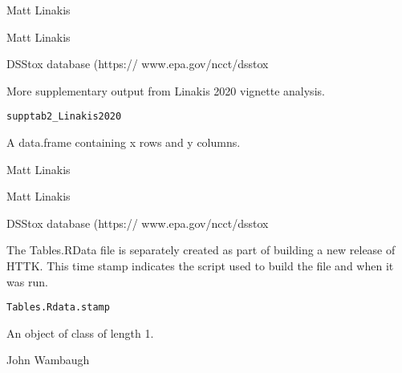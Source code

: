 \documentclass[a4paper]{book}
\begin{document}
%
\begin{Author}\relax
Matt Linakis
\end{Author}
%
\begin{Source}\relax
Matt Linakis
\end{Source}
%
\begin{References}\relax
DSStox database (https:// www.epa.gov/ncct/dsstox
\end{References}
%
\begin{Description}\relax
More supplementary output from Linakis 2020 vignette analysis.
\end{Description}
%
\begin{Usage}
\begin{verbatim}
supptab2_Linakis2020
\end{verbatim}
\end{Usage}
%
\begin{Format}
A data.frame containing x rows and y columns.
\end{Format}
%
\begin{Author}\relax
Matt Linakis
\end{Author}
%
\begin{Source}\relax
Matt Linakis
\end{Source}
%
\begin{References}\relax
DSStox database (https:// www.epa.gov/ncct/dsstox
\end{References}
%
\begin{Description}\relax
The Tables.RData file is separately created as part of building a new
release of HTTK. This time stamp indicates the script used to build the file
and when it was run.
\end{Description}
%
\begin{Usage}
\begin{verbatim}
Tables.Rdata.stamp
\end{verbatim}
\end{Usage}
%
\begin{Format}
An object of class  of length 1.
\end{Format}
%
\begin{Author}\relax
John Wambaugh
\end{Author}
\end{document}
